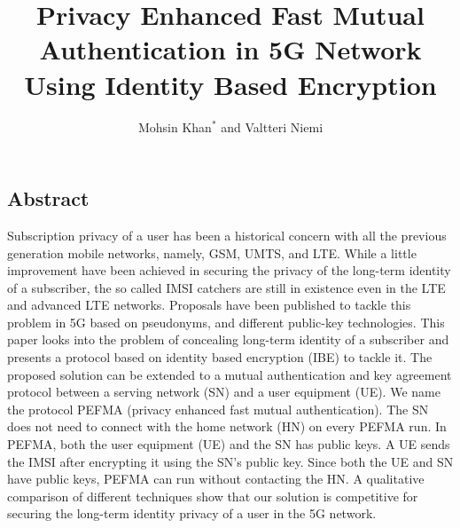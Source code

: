 \documentclass{river-journal}
\begin{document}
\begin{opening}
\title{Privacy Enhanced Fast Mutual Authentication in 5G Network Using Identity Based Encryption}
\author{Mohsin Khan$^{*}$ and Valtteri Niemi}
\end{opening}


\subsection*{Abstract}
Subscription privacy of a user has been a historical concern with all the previous generation mobile networks, namely, GSM, UMTS, and LTE. While a little improvement have been achieved in securing the privacy of the long-term identity of a subscriber, the so called IMSI catchers are still in existence even in the LTE and advanced LTE networks. Proposals have been published to tackle this problem in 5G based on pseudonyms, and different public-key technologies. This paper looks into the problem of concealing long-term identity of a subscriber and presents a protocol based on identity based encryption (IBE) to tackle it. The proposed solution can be extended to a mutual authentication and key agreement protocol between a serving network (SN) and a user equipment (UE). We name the protocol PEFMA (privacy enhanced fast mutual authentication). The SN does not need to connect with the home network (HN) on every PEFMA run. In PEFMA, both the user equipment (UE) and the SN has public keys. A UE sends the IMSI after encrypting it using the SN's public key. Since both the UE and SN have public keys, PEFMA can run without contacting the HN. A qualitative comparison of different techniques show that our solution is competitive for securing the long-term identity privacy of a user in the 5G network.

\end{document}
